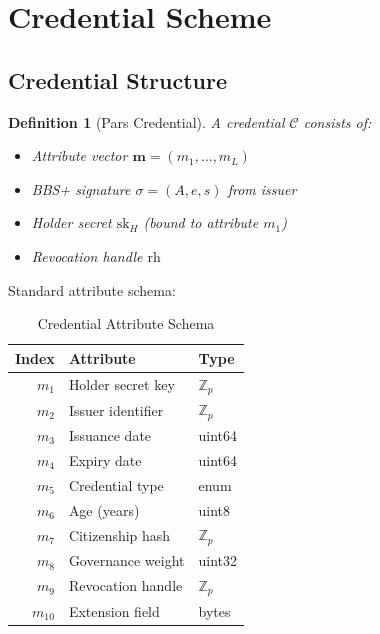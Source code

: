 \documentclass[11pt,a4paper]{article}
\newtheorem{definition}{Definition}[section]
\begin{document}
\section{Credential Scheme}
\label{sec:credentials}

\subsection{Credential Structure}

\begin{definition}[Pars Credential]
    A credential $\mathcal{C}$ consists of:
    \begin{itemize}
        \item Attribute vector $\mathbf{m} = (m_1, \ldots, m_L)$
        \item BBS+ signature $\sigma = (A, e, s)$ from issuer
        \item Holder secret $\mathrm{sk}_H$ (bound to attribute $m_1$)
        \item Revocation handle $\mathrm{rh}$
    \end{itemize}
\end{definition}

Standard attribute schema:

\begin{table}[h]
\centering
\caption{Credential Attribute Schema}
\label{tab:schema}
\begin{tabular}{@{}rll@{}}
\toprule
\textbf{Index} & \textbf{Attribute} & \textbf{Type} \\
\midrule
$m_1$ & Holder secret key & $\mathbb{Z}_p$ \\
$m_2$ & Issuer identifier & $\mathbb{Z}_p$ \\
$m_3$ & Issuance date & uint64 \\
$m_4$ & Expiry date & uint64 \\
$m_5$ & Credential type & enum \\
$m_6$ & Age (years) & uint8 \\
$m_7$ & Citizenship hash & $\mathbb{Z}_p$ \\
$m_8$ & Governance weight & uint32 \\
$m_9$ & Revocation handle & $\mathbb{Z}_p$ \\
$m_{10}$ & Extension field & bytes \\
\bottomrule
\end{tabular}
\end{table}
\end{document}
